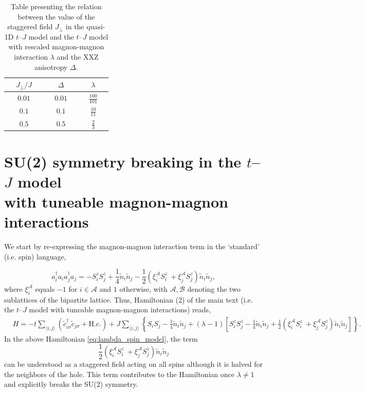 \documentclass[%
 reprint,
 amsmath,amssymb,
 aps, onecolumn,
prl,
]{revtex4-1}
\newcommand{\mean}[1]{\langle#1\rangle}
\begin{document}
\begin{table}[t!]
	\begin{center}
	\begin{tabular}{|| c || c | c ||} 
		\hline
		 ~~$J_\perp / J$~~ & ~~$\Delta$~~ & ~~$\lambda$~~ \\
		\hline\hline
		 ~~$0.01$~~ & ~~$0.01$~~ & ~~$\frac{100}{101}$~~ \\  
		\hline
		 $0.1$ & $0.1$ & $\frac{10}{11}$ \\ 
		\hline
		$0.5$ & $0.5$ & $\frac{2}{3}$ \\
		\hline
	\end{tabular}
	\end{center}
	\caption{Table presenting the relation between the value of the staggered field $J_\perp$ in the quasi-1D $t$--$J$ model and the $t$--$J$ model 
	with rescaled magnon-magnon interaction $\lambda$ and the XXZ anisotropy $\Delta$.}
	\label{tab:params}
\end{table}

\section{SU(2) symmetry breaking in the $t$--$J$ model \\ with tuneable magnon-magnon interactions}

We start by re-expressing the magnon-magnon interaction term in the `standard' (i.e. spin) language,

\begin{equation}
    a_i^\dag a_i a_j^\dag a_j = -S_i^z S_j^z + \frac{1}{4}\tilde{n}_i\tilde{n}_j - \frac{1}{2}\left(\xi_i^\mathcal{A} S_i^z \ + \xi_j^\mathcal{A} S_j^z \right)\tilde{n}_i\tilde{n}_j,
\end{equation}
%
where $\xi_i^\mathcal{A}$ equals $-1$ for $i\in\mathcal{A}$ and $1$ otherwise, with $\mathcal{A},\mathcal{B}$ denoting the two sublattices of the bipartite lattice. Thus, Hamiltonian (2) of the main text (i.e. the $t$--$J$ model with tuneable magnon-magnon interactions) reads,
%
\begin{equation}
        \begin{aligned}
    	&H = -t\sum_{\mean{i,j}}\left(\tilde{c}_{i\sigma}^\dagger\tilde{c}_{j\sigma} + \text{H.c.}\right)
	+ J\sum_{\mean{i,j}}\left\{S_i S_j - \frac{1}{4}\tilde{n}_i\tilde{n}_j 
	+ \left(\lambda-1\right) \left[S_i^z S_j^z - \frac{1}{4}\tilde{n}_i\tilde{n}_j + \frac{1}{2}\left(\xi_i^\mathcal{A} S_i^z \ + \xi_j^\mathcal{A} S_j^z \right)\tilde{n}_i\tilde{n}_j\right] \right\}.
	\end{aligned}
	\label{eq:lambda_spin_model}
\end{equation}
In the above Hamiltonian \eqref{eq:lambda_spin_model}, the term
%
\begin{equation}
    \frac{1}{2}\left(\xi_i^\mathcal{A} S_i^z \ + \xi_j^\mathcal{A} S_j^z \right)\tilde{n}_i\tilde{n}_j
        \label{eq:staggered_term}
\end{equation}
%
can be understood as a staggered field acting on all spins although it is halved for the neighbors of the hole. This term contributes to the Hamiltonian once $\lambda \neq 1$ and explicitly breaks the SU(2) symmetry.  
\end{document}
